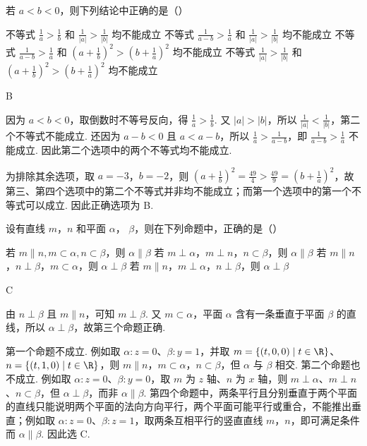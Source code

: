 \begin{problem}
若 \(a < b < 0\)，则下列结论中正确的是（\quad）

\choices
    {不等式 \(\frac{1}
    {a} > \frac{1}
    {b}\) 和 \(\frac{1}
    {|a|} > \frac{1}{|b|}\) 均不能成立}
 {不等式 \(\frac{1}{a - b} > \frac{1}{a}\) 和 \(\frac{1}{|a|} > \frac{1}{|b|}\) 均不能成立}
 {不等式 \(\frac{1}{a - b} > \frac{1}{a}\) 和 \((a + \frac{1}{b})^2 > (b + \frac{1}{a})^2\) 均不能成立}
 {不等式 \(\frac{1}{|a|} > \frac{1}{|b|}\) 和 \((a + \frac{1}{b})^2 > (b + \frac{1}{a})^2\) 均不能成立}
\end{problem}

\begin{answer}
B
\end{answer}

\begin{solution}
因为 \(a<b<0\)，取倒数时不等号反向，得 \(\frac1a>\frac1b\). 又 \(|a|>|b|\)，所以 \(\frac1{|a|}<\frac1{|b|}\)，第二个不等式不能成立. 还因为 \(a-b<0\) 且 \(a<a-b\)，所以 \(\frac1a>\frac1{a-b}\)，即 \(\frac1{a-b}>\frac1a\) 不能成立. 因此第二个选项中的两个不等式均不能成立.

为排除其余选项，取 \(a=-3\)，\(b=-2\)，则 \(\left(a+\frac1b\right)^2=\frac{49}{4}>\frac{49}{9}=\left(b+\frac1a\right)^2\)，故第三、第四个选项中的第二个不等式并非均不能成立；而第一个选项中的第一个不等式可以成立. 因此正确选项为 B.
\end{solution}

\begin{problem}
设有直线 \(m\)，\(n\) 和平面 \(\alpha \)， \(\beta\)，则在下列命题中，正确的是（\quad）

\choices
    {若 \(m \parallel n, m \subset \alpha, n \subset \beta\)，则 \(\alpha \parallel \beta\)}
    {若 \(m \perp \alpha\)，\(m \perp n\)，\(n \subset \beta\)，则 \(\alpha \parallel \beta\)}
    {若 \(m \parallel n\)，\(n \perp \beta\)，\(m \subset \alpha\)，则 \(\alpha \perp \beta\)}
    {若 \(m \parallel n\)，\(m \perp \alpha\)，\(n \perp \beta\)，则 \(\alpha \perp \beta\)}
\end{problem}

\begin{answer}
C
\end{answer}

\begin{solution}
由 \(n\perp\beta\) 且 \(m\parallel n\)，可知 \(m\perp\beta\). 又 \(m\subset\alpha\)，平面 \(\alpha\) 含有一条垂直于平面 \(\beta\) 的直线，所以 \(\alpha\perp\beta\)，故第三个命题正确.

第一个命题不成立. 例如取 \(\alpha:z=0\)、\(\beta:y=1\)，并取 \(m=\{(t,0,0)\mid t\in\R\}\)、\(n=\{(t,1,0)\mid t\in\R\}\)，则 \(m\parallel n\)，\(m\subset\alpha\)，\(n\subset\beta\)，但 \(\alpha\) 与 \(\beta\) 相交. 第二个命题也不成立. 例如取 \(\alpha:z=0\)、\(\beta:y=0\)，取 \(m\) 为 \(z\) 轴、\(n\) 为 \(x\) 轴，则 \(m\perp\alpha\)、\(m\perp n\)、\(n\subset\beta\)，但 \(\alpha\perp\beta\)，而非 \(\alpha\parallel\beta\). 第四个命题中，两条平行且分别垂直于两个平面的直线只能说明两个平面的法向方向平行，两个平面可能平行或重合，不能推出垂直；例如取 \(\alpha:z=0\)、\(\beta:z=1\)，取两条互相平行的竖直直线 \(m\)，\(n\)，即可满足条件而 \(\alpha\parallel\beta\). 因此选 C.
\end{solution}


